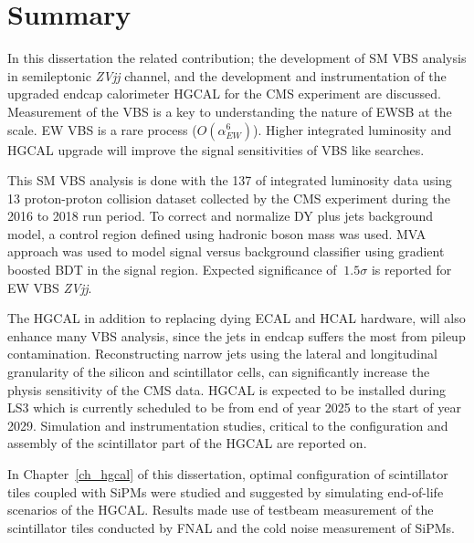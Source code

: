 \chapter{
  Summary
 }\label{ch_results}

In this dissertation the related contribution; the
development of \gls{SM} \gls{VBS}
analysis in semileptonic \textit{ZVjj} channel, and
the development and instrumentation of the upgraded endcap calorimeter
\gls{HGCAL} for the \gls{CMS} experiment are discussed.
Measurement of the \gls{VBS} is a key to understanding the nature of \gls{EWSB} at the \TeV{} scale.
EW VBS is a rare process (\(O(\alpha_{EW}^{6})\)).
Higher integrated luminosity and HGCAL upgrade will improve the signal sensitivities of VBS like searches.

This \gls{SM} \gls{VBS} analysis is done with the 137 \fbinv{} of integrated luminosity data
using 13\TeV{} proton-proton collision
dataset collected by the \gls{CMS} experiment during the 2016 to 2018 run period.
To correct
and normalize DY plus jets background model, a control region
defined using hadronic boson mass was used.
\gls{MVA} approach was used to
model signal versus background classifier using gradient boosted
\gls{BDT} in the signal region.
Expected significance of \( ~1.5\sigma \) is reported for
\gls{EW} \gls{VBS} \textit{ZVjj}.

The \gls{HGCAL} in addition to replacing dying \gls{ECAL} and \gls{HCAL}
hardware, will also enhance many \gls{VBS} analysis,
since the jets in endcap suffers the most from pileup
contamination. Reconstructing narrow jets
using the lateral and longitudinal granularity of the silicon and scintillator cells,
can significantly increase the physis sensitivity of the \gls{CMS} data.
\gls{HGCAL} is expected to be installed
during \gls{LS3} which is currently scheduled to be from end of year 2025
to the start of year 2029. Simulation and instrumentation studies,
critical to the configuration and assembly of the scintillator part of
the \gls{HGCAL} are reported on.

In Chapter~\ref{ch_hgcal} of this dissertation, optimal configuration
of scintillator tiles coupled with \glspl{SiPM}
were studied and suggested by simulating end-of-life scenarios
of the \gls{HGCAL}. Results made use of testbeam measurement of
the scintillator tiles conducted by \gls{FNAL}
and the cold noise measurement of \glspl{SiPM}.